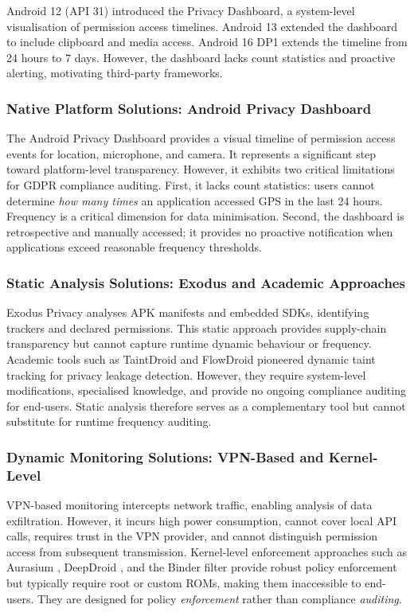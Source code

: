 Android 12 (API 31) introduced the Privacy Dashboard, a system-level visualisation of permission access timelines. Android 13 extended the dashboard to include clipboard and media access. Android 16 DP1 extends the timeline from 24 hours to 7 days. However, the dashboard lacks count statistics and proactive alerting, motivating third-party frameworks.

\subsubsection{Native Platform Solutions: Android Privacy Dashboard}

The Android Privacy Dashboard provides a visual timeline of permission access events for location, microphone, and camera. It represents a significant step toward platform-level transparency. However, it exhibits two critical limitations for GDPR compliance auditing. First, it lacks count statistics: users cannot determine \emph{how many times} an application accessed GPS in the last 24 hours. Frequency is a critical dimension for data minimisation. Second, the dashboard is retrospective and manually accessed; it provides no proactive notification when applications exceed reasonable frequency thresholds.

\subsubsection{Static Analysis Solutions: Exodus and Academic Approaches}

Exodus Privacy analyses APK manifests and embedded SDKs, identifying trackers and declared permissions. This static approach provides supply-chain transparency but cannot capture runtime dynamic behaviour or frequency. Academic tools such as TaintDroid \cite{49} and FlowDroid pioneered dynamic taint tracking for privacy leakage detection. However, they require system-level modifications, specialised knowledge, and provide no ongoing compliance auditing for end-users. Static analysis therefore serves as a complementary tool but cannot substitute for runtime frequency auditing.

\subsubsection{Dynamic Monitoring Solutions: VPN-Based and Kernel-Level}

VPN-based monitoring intercepts network traffic, enabling analysis of data exfiltration. However, it incurs high power consumption, cannot cover local API calls, requires trust in the VPN provider, and cannot distinguish permission access from subsequent transmission. Kernel-level enforcement approaches such as Aurasium \cite{42}, DeepDroid \cite{44}, and the Binder filter \cite{45} provide robust policy enforcement but typically require root or custom ROMs, making them inaccessible to end-users. They are designed for policy \emph{enforcement} rather than compliance \emph{auditing}.

